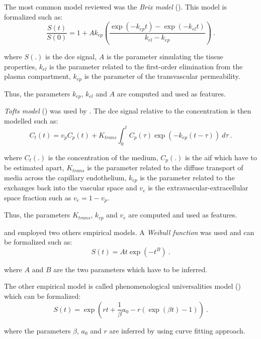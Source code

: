 \begin{enumerate}[leftmargin=*]
The most common model reviewed was the \textit{Brix model} (\cite{Artan2009,Artan2010,Sung2011,Liu2009,Ozer2009,Ozer2010}). This model is formalized such as:
\begin{equation}
	\frac{S(t)}{S(0)} = 1 + A k_{ep} \left( \frac{\exp( -k_{ep} t ) - \exp( -k_{el} t )}{k_{el} - k_{ep}} \right) \ .
	\label{eq:brixmod}
\end{equation}

\noindent where $S(.)$ is the \ac{dce} signal, $A$ is the parameter simulating the tissue properties, $k_{el}$ is the parameter related to the first-order elimination from the plasma compartment, $k_{ep}$ is the parameter of the transvascular permeability.

Thus, the parameters $k_{ep}$, $k_{el}$ and $A$ are computed and used as features.

\textit{Tofts model} (\cite{Tofts1997}) was used by \cite{Langer2009,Giannini2013,Niaf2011,Niaf2012,Mazzetti2011}. The \ac{dce} signal relative to the concentration is then modelled such as:
\begin{equation}
	C_t(t) = v_p C_p(t) + K_{trans} \int_{0}^{t} C_p(\tau) \exp( -k_{ep}(t-\tau) ) \ d\tau \ .
	\label{eq:tofts} 
\end{equation}

\noindent where $C_t(.)$ is the concentration of the medium, $C_p(.)$ is the \ac{aif} which have to be estimated apart, $K_{trans}$ is the parameter related to the diffuse transport of media across the capillary endothelium, $k_{ep}$ is the parameter related to the exchanges back into the vascular space and $v_e$ is the extravascular-extracellular space fraction such as $v_e = 1 - v_p$. 

Thus, the parameters $K_{trans}$, $k_{ep}$ and $v_e$ are computed and used as features.

\cite{Mazzetti2011} and \cite{Giannini2013} employed two others empirical models. A \textit{Weibull function} was used and can be formalized such as:
\begin{equation}
	S(t) = A t \exp( -t^{B} ) \ .
	\label{eq:weibull}
\end{equation}

\noindent where $A$ and $B$ are the two parameters which have to be inferred.

The other empirical model is called phenomenological universalities model (\cite{Castorina2006}) which can be formalized:
\begin{equation}
	S(t) = \exp \left( r t + \frac{1}{\beta} a_0 - r ( \exp( \beta t ) - 1 ) \right) \ .
	\label{eq:pun}
\end{equation}

\noindent where the parameters $\beta$, $a_0$ and $r$ are inferred by using curve fitting approach.

\end{enumerate}

